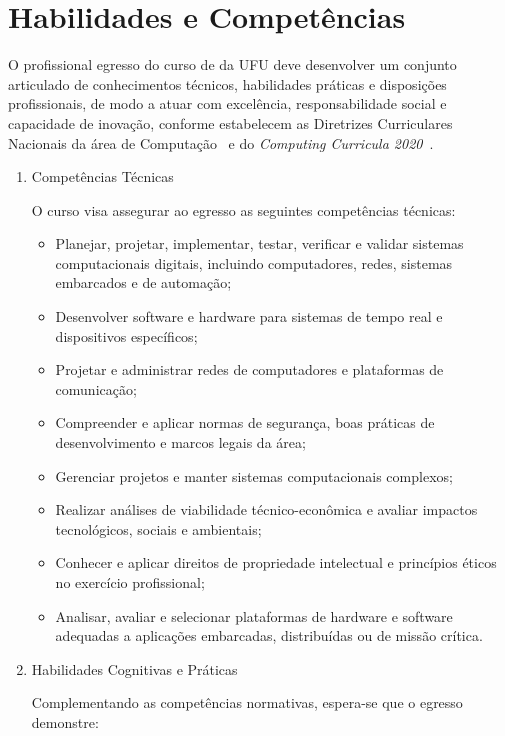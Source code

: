 \section{Habilidades e Competências}

O profissional egresso do curso de \ppccurso da UFU deve desenvolver um conjunto articulado de conhecimentos técnicos, habilidades práticas e disposições profissionais, de modo a atuar com excelência, responsabilidade social e capacidade de inovação, conforme estabelecem as Diretrizes Curriculares Nacionais da área de Computação~\cite{MEC:CNE:CES:5:2016} e do \textit{Computing Curricula 2020}~\cite{ACM:CC2020}.

\begin{enumerate}[label=\Roman*.]
\item Competências Técnicas~\cite{MEC:CNE:CES:5:2016}

O curso visa assegurar ao egresso as seguintes competências técnicas:

\begin{itemize}
    \item Planejar, projetar, implementar, testar, verificar e validar sistemas computacionais digitais, incluindo computadores, redes, sistemas embarcados e de automação;
    \item Desenvolver software e hardware para sistemas de tempo real e dispositivos específicos;
    \item Projetar e administrar redes de computadores e plataformas de comunicação;
    \item Compreender e aplicar normas de segurança, boas práticas de desenvolvimento e marcos legais da área;
    \item Gerenciar projetos e manter sistemas computacionais complexos;
    \item Realizar análises de viabilidade técnico-econômica e avaliar impactos tecnológicos, sociais e ambientais;
    \item Conhecer e aplicar direitos de propriedade intelectual e princípios éticos no exercício profissional;
    \item Analisar, avaliar e selecionar plataformas de hardware e software adequadas a aplicações embarcadas, distribuídas ou de missão crítica.
\end{itemize}

\item Habilidades Cognitivas e Práticas~\cite{ACM:CC2020}

Complementando as competências normativas, espera-se que o egresso demonstre:


\end{enumerate}
